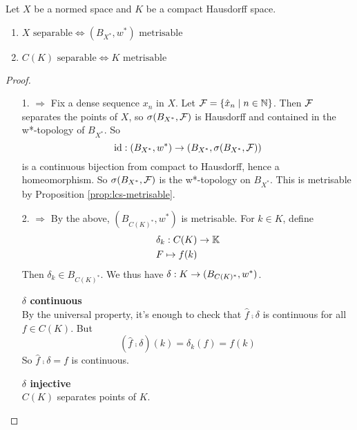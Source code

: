 \documentclass{article}
\begin{document}
\begin{nprop}\label{prop:ck-separable}
  Let $X$ be a normed space and $K$ be a compact Hausdorff space.
  \begin{enumerate}
    \item $X \text{ separable} \iff (B_{X^*}, w^*) \text{ metrisable}$
    \item $C(K) \text{ separable} \iff K \text{ metrisable}$
  \end{enumerate}
\end{nprop}
\begin{proof}~
  \begin{itemize}
    \item[1. $\Rightarrow$] Fix a dense sequence $x_n$ in $X$. Let $\mathcal F = \{\hat x_n \mid n \in \mathbb N\}$. Then $\mathcal F$ separates the points of $X$, so $\sigma(B_{X^*}, \mathcal F)$ is Hausdorff and contained in the w*-topology of $B_{X^*}$. So
    $$\operatorname{id} : (B_{X^*}, w^*) \rightarrow (B_{X^*}, \sigma(B_{X^*}, \mathcal F))$$
    is a continuous bijection from compact to Hausdorff, hence a homeomorphism. So $\sigma(B_{X^*}, \mathcal F)$ is the w*-topology on $B_{X^*}$. This is metrisable by Proposition \ref{prop:lcs-metrisable}.
  \item[2. $\Rightarrow$] By the above, $(B_{C(K)^*}, w^*)$ is metrisable. For $k \in K$, define
  \begin{align*}
    \delta_k : C(K) & \rightarrow \mathbb K \\
    F \mapsto f(k)
  \end{align*}
  Then $\delta_k \in B_{C(K)^*}$. We thus have $\delta : K \rightarrow (B_{C(K)^*}, w^*)$.

  {\bf $\delta$ continuous} \\
  By the universal property, it's enough to check that $\hat f \comp \delta$ is continuous for all $f \in C(K)$. But
  $$(\hat f \comp \delta)(k) = \delta_k(f) = f(k)$$
  So $\hat f \comp \delta = f$ is continuous.

  {\bf $\delta$ injective} \\
  $C(K)$ separates points of $K$.


\end{itemize}
\end{proof}
\end{document}
